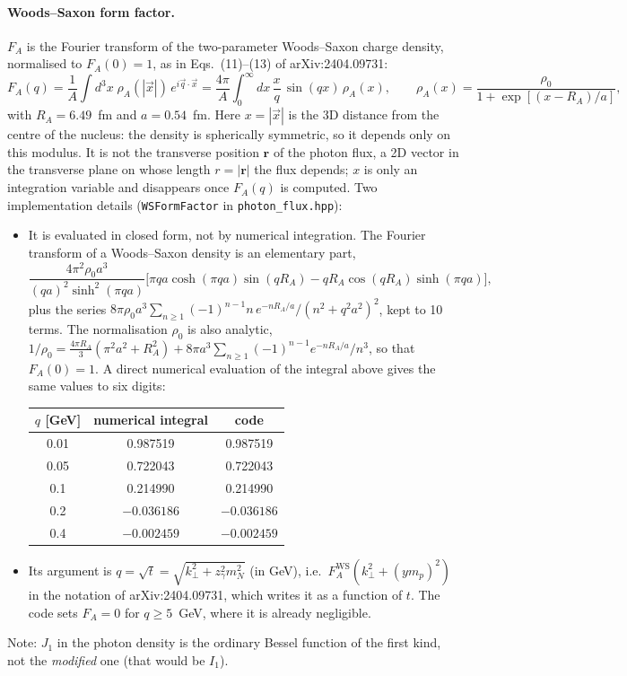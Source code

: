 \documentclass[11pt]{article}
\begin{document}
\paragraph{Woods--Saxon form factor.} $F_A$ is the Fourier transform of the two-parameter
Woods--Saxon charge density, normalised to $F_A(0)=1$, as in Eqs.~(11)--(13) of arXiv:2404.09731:
\begin{equation}
  F_A(q)=\frac{1}{A}\int d^3x\;\rho_A(|\vec x|)\,e^{i\vec q\cdot\vec x}
  =\frac{4\pi}{A}\int_0^\infty dx\,\frac{x}{q}\,\sin(qx)\,\rho_A(x),\qquad
  \rho_A(x)=\frac{\rho_0}{1+\exp[(x-R_A)/a]},
\end{equation}
with $R_A=6.49$~fm and $a=0.54$~fm. Here $x=|\vec x|$ is the 3D distance from the centre of the
nucleus: the density is spherically symmetric, so it depends only on this modulus. It is not the
transverse position $\mathbf r$ of the photon flux, a 2D vector in the transverse plane on whose
length $r=|\mathbf r|$ the flux depends; $x$ is only an integration variable and disappears once
$F_A(q)$ is computed. Two implementation details (\texttt{WSFormFactor} in
\texttt{photon\_flux.hpp}):
\begin{itemize}
\item It is evaluated in closed form, not by numerical integration. The Fourier transform of a
  Woods--Saxon density is an elementary part,
  \begin{equation}
    \frac{4\pi^2\rho_0a^3}{(qa)^2\sinh^2(\pi qa)}
    \Big[\pi qa\cosh(\pi qa)\sin(qR_A)-qR_A\cos(qR_A)\sinh(\pi qa)\Big],
  \end{equation}
  plus the series $8\pi\rho_0a^3\sum_{n\geq1}(-1)^{n-1}n\,e^{-nR_A/a}/(n^2+q^2a^2)^2$, kept to 10
  terms. The normalisation $\rho_0$ is also analytic,
  $1/\rho_0=\tfrac{4\pi R_A}{3}(\pi^2a^2+R_A^2)+8\pi a^3\sum_{n\geq1}(-1)^{n-1}e^{-nR_A/a}/n^3$,
  so that $F_A(0)=1$. A direct numerical evaluation of the integral above gives the same values to
  six digits:

  \begin{center}
  \begin{tabular}{ccc}
  \toprule
  $q$ [GeV] & numerical integral & code \\
  \midrule
  0.01 & 0.987519 & 0.987519 \\
  0.05 & 0.722043 & 0.722043 \\
  0.1  & 0.214990 & 0.214990 \\
  0.2  & $-0.036186$ & $-0.036186$ \\
  0.4  & $-0.002459$ & $-0.002459$ \\
  \bottomrule
  \end{tabular}
  \end{center}
\item Its argument is $q=\sqrt{t}=\sqrt{k_\perp^2+z_\gamma^2m_N^2}$ (in GeV), i.e.\
  $F_A^{\text{WS}}(k_\perp^2+(ym_p)^2)$ in the notation of arXiv:2404.09731, which writes it as a
  function of $t$. The code sets $F_A=0$ for $q\geq5$~GeV, where it is already negligible.
\end{itemize}
Note: $J_1$ in the photon density is the ordinary Bessel function of the first kind, not the
\emph{modified} one (that would be $I_1$).
\end{document}
